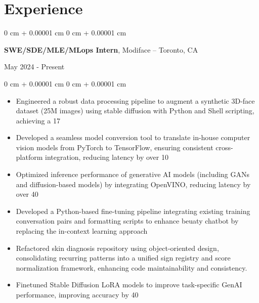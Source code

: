 \documentclass[11pt, letterpaper]{article}
\newenvironment{highlights}{
    \begin{itemize}[
        topsep=0.08 cm,
        parsep=0.08 cm,
        partopsep=0pt,
        itemsep=0pt,
        leftmargin=0.2 cm + 17pt
    ]
}
{
    \end{itemize}
}
\newenvironment{onecolentry}{
    \begin{adjustwidth}{
        0 cm + 0.00001 cm
    }{
        0 cm + 0.00001 cm
    }
}{
    \end{adjustwidth}
}
\newenvironment{twocolentry}[2][]{
    \onecolentry
    \def\secondColumn{#2}
    \setcolumnwidth{\fill, 4.5 cm}
    \begin{paracol}{2}
}{
    \switchcolumn \raggedleft \secondColumn
    \end{paracol}
    \endonecolentry
}
\begin{document}
\section{Experience}
\vspace{0.08 cm}
\begin{twocolentry}{May 2024 - Present}
    {\textbf{SWE/SDE/MLE/MLops Intern}}, Modiface -- Toronto, CA
\end{twocolentry}
\vspace{0.05 cm}
\begin{onecolentry}
    \begin{highlights}
        \item Engineered a robust data processing pipeline to augment a synthetic 3D-face dataset (25M images) using  stable diffusion with Python and Shell scripting, achieving a 17%
        \item Developed a seamless model conversion tool to translate in-house computer vision models from PyTorch to TensorFlow, ensuring consistent cross-platform integration, reducing latency by over 10%
        \item Optimized inference performance of generative AI models (including GANs and diffusion-based models) by integrating OpenVINO, reducing latency by over 40%
        \item Developed a Python-based fine-tuning pipeline integrating existing training conversation pairs and formatting scripts to enhance beuaty chatbot by replacing the in-context learning approach
        \item Refactored skin diagnosis repository using object-oriented design, consolidating recurring patterns into a unified sign registry and score normalization framework, enhancing code maintainability and consistency.
        \item Finetuned Stable Diffusion LoRA models to improve task-specific GenAI performance, improving accuracy by 40%
    \end{highlights}
\end{onecolentry}
\vspace{0.35 cm}
\end{document}
